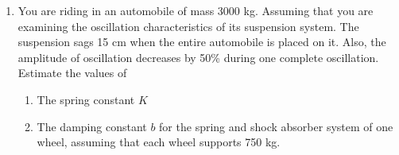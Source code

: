 \begin{enumerate}[label=\thesection.\arabic*,ref=\thesection.\theenumi]
\item You are riding in an automobile of mass 3000 kg. Assuming that you are examining the oscillation characteristics of its suspension system. The suspension sags 15 cm when the entire automobile is placed on it. Also, the amplitude of oscillation decreases by 50\% during one complete oscillation. Estimate the values of
\begin{enumerate}[label=(\alph*)]
    \item The spring constant \( K \)
    \item The damping constant \( b \) for the spring and shock absorber system of one wheel, assuming that each wheel supports 750 kg.
\end{enumerate}
\solution

\pagebreak
\end{enumerate}
